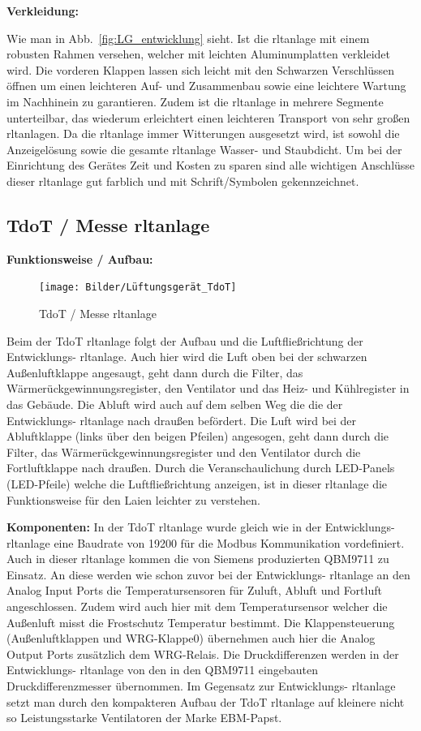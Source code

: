 \textbf{Verkleidung:}

Wie man in Abb.~\ref{fig:LG_entwicklung} sieht. Ist die \ac{rltanlage} mit einem robusten Rahmen versehen, welcher mit leichten Aluminumplatten verkleidet wird. Die vorderen Klappen lassen sich leicht mit den Schwarzen Verschlüssen öffnen um einen leichteren Auf- und Zusammenbau sowie eine leichtere Wartung im Nachhinein zu garantieren. Zudem ist die \ac{rltanlage} in mehrere Segmente unterteilbar, das wiederum erleichtert einen leichteren Transport von sehr großen \ac{rltanlagen}. Da die \ac{rltanlage} immer Witterungen ausgesetzt wird, ist sowohl die Anzeigelösung sowie die gesamte \ac{rltanlage} Wasser- und Staubdicht. Um bei der Einrichtung des Gerätes Zeit und Kosten zu sparen sind alle wichtigen Anschlüsse dieser \ac{rltanlage} gut farblich und mit Schrift/Symbolen gekennzeichnet. 





\subsection{TdoT / Messe \ac{rltanlage}}

\textbf{Funktionsweise / Aufbau:}
\begin{figure}[H]
	\centering
	\texttt{[image: Bilder/Lüftungsgerät\_TdoT]}
	\caption{TdoT / Messe \ac{rltanlage}} 
	\label{fig:LG_tdot}
\end{figure}

Beim der TdoT \ac{rltanlage} folgt der Aufbau und die Luftfließrichtung der Entwicklungs- \ac{rltanlage}. Auch hier wird die Luft oben bei der schwarzen Außenluftklappe angesaugt, geht dann durch die Filter, das Wärmerückgewinnungsregister, den Ventilator und das Heiz- und Kühlregister in das Gebäude. Die Abluft wird auch auf dem selben Weg die die der Entwicklungs- \ac{rltanlage} nach draußen befördert. Die Luft wird bei der Abluftklappe (links über den beigen Pfeilen) angesogen, geht dann durch die Filter, das Wärmerückgewinnungsregister und den Ventilator durch die Fortluftklappe nach draußen. Durch die Veranschaulichung durch LED-Panels (LED-Pfeile) welche die Luftfließrichtung anzeigen, ist in dieser \ac{rltanlage} die Funktionsweise für den Laien leichter zu verstehen.

\textbf{Komponenten:}
In der TdoT \ac{rltanlage} wurde gleich wie in der Entwicklungs- \ac{rltanlage} eine Baudrate von 19200 für die Modbus Kommunikation vordefiniert. Auch in dieser \ac{rltanlage} kommen die von Siemens produzierten QBM9711 zu Einsatz. An diese werden wie schon zuvor bei der Entwicklungs- \ac{rltanlage} an den Analog Input Ports die Temperatursensoren für Zuluft, Abluft und Fortluft angeschlossen. Zudem wird auch hier mit dem Temperatursensor welcher die Außenluft misst die Frostschutz Temperatur bestimmt. Die Klappensteuerung (Außenluftklappen und WRG-Klappe0) übernehmen auch hier die Analog Output Ports zusätzlich dem WRG-Relais. Die Druckdifferenzen werden in der Entwicklungs- \ac{rltanlage} von den in den QBM9711 eingebauten Druckdifferenzmesser übernommen. Im Gegensatz zur Entwicklungs- \ac{rltanlage} setzt man durch den kompakteren Aufbau der TdoT \ac{rltanlage} auf kleinere nicht so Leistungsstarke Ventilatoren der Marke EBM-Papst. 


